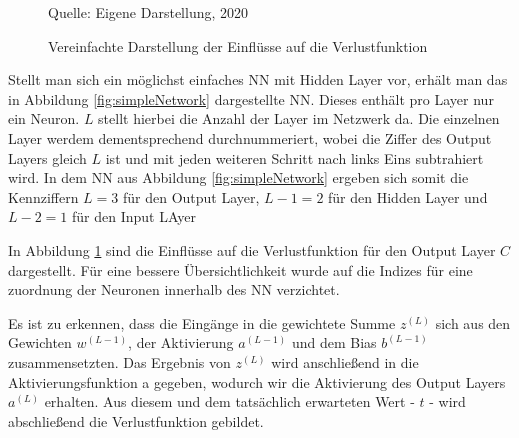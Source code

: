 \begin{figure}[H]
    \centering
    \caption[]{Vereinfachte Darstellung der Einflüsse auf die Verlustfunktion}
    \label{fig:unfoldedCost}
    Quelle: Eigene Darstellung, 2020
\end{figure}

Stellt man sich ein möglichst einfaches \ac{NN} mit Hidden Layer vor, erhält man das in Abbildung \ref{fig:simpleNetwork} dargestellte \ac{NN}. Dieses enthält pro Layer nur ein Neuron. $L$ stellt hierbei die Anzahl der Layer im Netzwerk da. Die einzelnen Layer werdem dementsprechend durchnummeriert, wobei die Ziffer des Output Layers gleich $L$ ist und mit jeden weiteren Schritt nach links Eins subtrahiert wird. In dem \ac{NN} aus Abbildung \ref{fig:simpleNetwork} ergeben sich somit die Kennziffern $L = 3$ für den Output Layer, $L-1 = 2 $ für den Hidden Layer und $L-2 = 1 $ für den Input LAyer

In Abbildung \ref{fig:unfoldedCost} sind die Einflüsse auf die Verlustfunktion für den Output Layer $C$ dargestellt.  Für eine bessere Übersichtlichkeit wurde auf die Indizes für eine zuordnung der Neuronen innerhalb des \ac{NN} verzichtet.

Es ist zu erkennen, dass die Eingänge in die gewichtete Summe $z^{(L)}$ sich aus den Gewichten $w^{(L-1)}$, der Aktivierung $a^{(L-1)}$ und dem Bias $b^{(L-1)}$ zusammensetzten. Das Ergebnis von $z^{(L)}$ wird anschließend in die Aktivierungsfunktion a gegeben, wodurch wir die Aktivierung des Output Layers $a^{(L)}$ erhalten. Aus diesem und dem tatsächlich erwarteten Wert - $t$ - wird abschließend die Verlustfunktion gebildet. 

